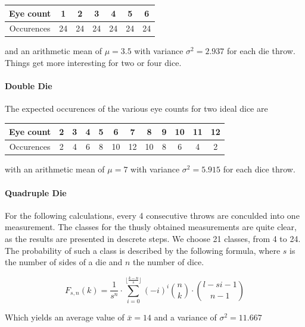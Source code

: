 \documentclass{scrreprt}
\begin{document}
\begin{center}
    \begin{tabular}{|c|cccccc|}
    \hline
    Eye count & 1 & 2 & 3 & 4 & 5 & 6\\
    \hline
    Occurences & 24 & 24 & 24 & 24 & 24 & 24\\
    \hline
    \end{tabular}
\end{center}
and an arithmetic mean of $\mu = 3.5$ with variance $\sigma^2 = 2.937$ for each die throw.
\linebreak
Things get more interesting for two or four dice.

\paragraph{Double Die}
The expected occurences of the various eye counts for two ideal dice are
\begin{center}
    \begin{tabular}{|c|ccccccccccc|}
    \hline
    Eye count & 2 & 3 & 4 & 5 & 6 & 7 & 8 & 9 & 10 & 11 & 12\\
    \hline
    Occurences & 2 & 4 & 6 & 8 & 10 & 12 & 10 & 8 & 6 & 4 & 2\\
    \hline
    \end{tabular}
\end{center}

with an arithmetic mean of $\mu = 7$ with variance $\sigma^2 = 5.915$ for each dice throw.

\paragraph{Quadruple Die}
For the following calculations, every 4 consecutive throws are conculded into one measurement. The classes for the thusly obtained measurements are quite clear, as the results are presented in descrete steps. We choose 21 classes, from 4 to 24.
The probability of such a class is described by the following formula\cite{dicewiki}, where $s$ is the number of sides of a die and $n$ the number of dice.

\begin{equation}
F_{s,n}(k)= \frac{1}{s^n}\cdot\sum_{i=0}^{\lfloor\frac{k-n}{s} \rfloor}(-i)^i\binom{n}{k}\cdot\binom{l-si-1}{n-1}
\end{equation}

Which yields an average value of $\bar{x}=14$ and a variance of $\sigma^2=11.667$
\end{document}
